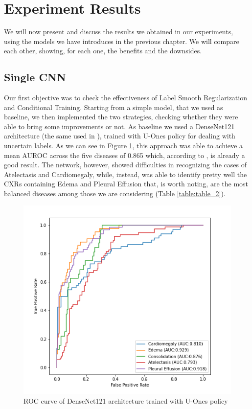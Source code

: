\section{Experiment Results}
\label{sec:experiment_result}

We will now present and discuss the results we obtained in our experiments, using the models we have introduces in the previous chapter. We will compare each other, showing, for each one, the benefits and the downsides.

\vspace{5mm}

\subsection{Single CNN}
Our first objective was to check the effectiveness of Label Smooth Regularization and Conditional Training. Starting from a simple model, that we used as baseline, we then implemented the two strategies, checking whether they were able to bring some improvements or not.
As baseline we used a DenseNet121 architecture (the same used in \cite{irvin2019chexpert} \cite{pham2019interpreting}), trained with U-Ones policy for dealing with uncertain labels. As we can see in Figure \ref{fig:figure_5.2}, this approach was able to achieve a mean AUROC across the five diseases of 0.865 which, according to \cite{auroc}, is already a good result. The network, however, showed difficulties in recognizing the cases of Atelectasis and Cardiomegaly, while, instead, was able to identify pretty well the \acp{CXR} containing Edema and Pleural Effusion that, is worth noting, are the most balanced diseases among those we are considering (Table \ref{table:table_2}).

\begin{figure}[htbp!]
    \centering
    \includegraphics[scale=0.57]{Tesi/images/Results/densenet121_baseline.png}
    \caption[ROC curve for U-Ones policy]{ROC curve of DenseNet121 architecture trained with U-Ones policy}
    \label{fig:figure_5.2}
\end{figure}

